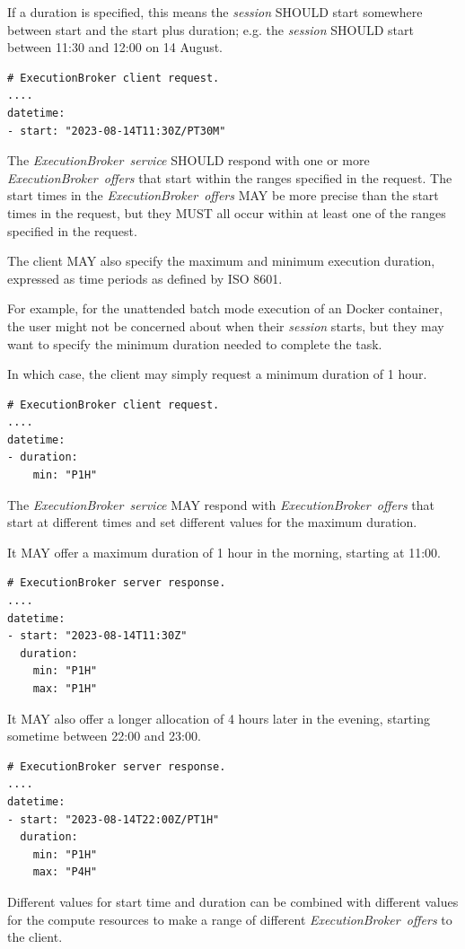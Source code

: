\documentclass[11pt,a4paper]{ivoa}
\newcommand{\execbrokerservice}[1] {\textit{ExecutionBroker~service#1}}
\newcommand{\execoffer}[1] {\textit{ExecutionBroker~offer#1}}
\newcommand{\workerjob}[1] {\textit{session#1}}
\newcommand{\dockercontainer} {Docker container}
\begin{document}
If a duration is specified, this means the \workerjob{} SHOULD start somewhere between
start and the start plus duration;
e.g. the \workerjob{} SHOULD start between 11:30 and 12:00 on 14 August.
\begin{lstlisting}[]
# ExecutionBroker client request.
....
datetime:
- start: "2023-08-14T11:30Z/PT30M"
\end{lstlisting}

The \execbrokerservice{} SHOULD respond with one or more \execoffer{s} that start within
the ranges specified in the request.
The start times in the \execoffer{s} MAY be more precise than the start times in the request,
but they MUST all occur within at least one of the ranges specified in the request.

The client MAY also specify the maximum and minimum execution duration,
expressed as time periods as defined by ISO 8601.

For example, for the unattended batch mode execution of an \dockercontainer, the user might not be concerned about
when their \workerjob{} starts, but they may want to specify the minimum duration needed to complete the task.

In which case, the client may simply request a minimum duration of 1 hour.
\begin{lstlisting}[]
# ExecutionBroker client request.
....
datetime:
- duration:
    min: "P1H"
\end{lstlisting}

The \execbrokerservice{} MAY respond with \execoffer{s} that start at different times and
set different values for the maximum duration.

It MAY offer a maximum duration of 1 hour in the morning, starting at 11:00.
\begin{lstlisting}[]
# ExecutionBroker server response.
....
datetime:
- start: "2023-08-14T11:30Z"
  duration:
    min: "P1H"
    max: "P1H"
\end{lstlisting}

It MAY also offer a longer allocation of 4 hours later in the evening,
starting sometime between 22:00 and 23:00.
\begin{lstlisting}[]
# ExecutionBroker server response.
....
datetime:
- start: "2023-08-14T22:00Z/PT1H"
  duration:
    min: "P1H"
    max: "P4H"
\end{lstlisting}

Different values for start time and duration can be combined with different values for the
compute resources to make a range of different \execoffer{s} to the client.
\end{document}

